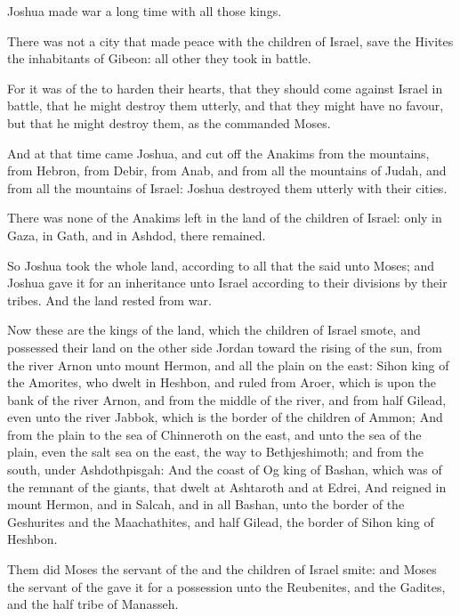 \Verse Joshua made war a long time with all those kings.

\Verse There was not a city that made peace with the children of Israel, save the Hivites the inhabitants of Gibeon: all other they took in battle.

\Verse For it was of the \LORD to harden their hearts, that they should come against Israel in battle, that he might destroy them utterly, and that they might have no favour, but that he might destroy them, as the \LORD commanded Moses.

\Verse And at that time came Joshua, and cut off the Anakims from the mountains, from Hebron, from Debir, from Anab, and from all the mountains of Judah, and from all the mountains of Israel: Joshua destroyed them utterly with their cities.

\Verse There was none of the Anakims left in the land of the children of Israel: only in Gaza, in Gath, and in Ashdod, there remained.

\Verse So Joshua took the whole land, according to all that the \LORD said unto Moses; and Joshua gave it for an inheritance unto Israel according to their divisions by their tribes. And the land rested from war.


\Chapter
\Verse Now these are the kings of the land, which the children of Israel smote, and possessed their land on the other side Jordan toward the rising of the sun, from the river Arnon unto mount Hermon, and all the plain on the east: \Verse Sihon king of the Amorites, who dwelt in Heshbon, and ruled from Aroer, which is upon the bank of the river Arnon, and from the middle of the river, and from half Gilead, even unto the river Jabbok, which is the border of the children of Ammon; \Verse And from the plain to the sea of Chinneroth on the east, and unto the sea of the plain, even the salt sea on the east, the way to Bethjeshimoth; and from the south, under Ashdothpisgah: \Verse And the coast of Og king of Bashan, which was of the remnant of the giants, that dwelt at Ashtaroth and at Edrei, \Verse And reigned in mount Hermon, and in Salcah, and in all Bashan, unto the border of the Geshurites and the Maachathites, and half Gilead, the border of Sihon king of Heshbon.

\Verse Them did Moses the servant of the \LORD and the children of Israel smite: and Moses the servant of the \LORD gave it for a possession unto the Reubenites, and the Gadites, and the half tribe of Manasseh.

